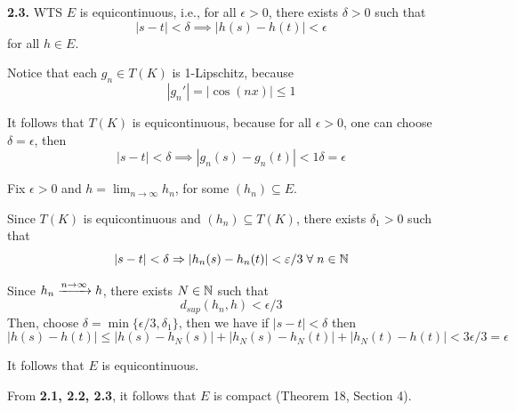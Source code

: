 \documentclass[a4paper, 12pt]{article}
\begin{document}
\begin{solution}
    \textbf{2.3.} WTS $E$ is equicontinuous, i.e., for all $\epsilon > 0$, there exists $\delta > 0$ such that \[
    |s - t| < \delta \implies |h(s) - h(t)| < \epsilon
    \]
    for all $h \in E$.

    Notice that each $g_n \in T(K)$ is 1-Lipschitz, because \[
    |g_n'| = |\cos(nx)| \leq 1
    \]

    It follows that $T(K)$ is equicontinuous, because for all $\epsilon > 0$, one can choose $\delta = \epsilon$, then \[
    |s - t| < \delta \implies |g_n(s) - g_n(t)| < 1 \delta = \epsilon
    \]


    Fix $\epsilon > 0$ and $h = \lim_{n \to \infty}h_n$, for some $(h_n) \subseteq E$.

    Since $T(K)$ is equicontinuous and $(h_n) \subseteq T(K)$, there exists $\delta_1 > 0$ such that \[
    |s - t| < \delta \implies |h_n(s) - h_n(t)| < \epsilon/3 \forall n \in \bbn
    \]

    Since $h_n \xrightarrow{n \to \infty} h$, there exists $N \in \mathbb{N}$ such that \[
    d_{sup}(h_n, h) < \epsilon/3
    \]
    Then, choose $\delta = \min\{\epsilon / 3, \delta_1\}$, then we have if $|s - t| < \delta$ then \[
    |h(s) - h(t)| \leq |h(s) - h_N(s)| + |h_N(s) - h_N(t)| + |h_N(t) - h(t)| < 3\epsilon/3 = \epsilon
    \]

    It follows that $E$ is equicontinuous.

    From \textbf{2.1, 2.2, 2.3}, it follows that $E$ is compact (Theorem 18, Section 4). 
\end{solution}
\end{document}
